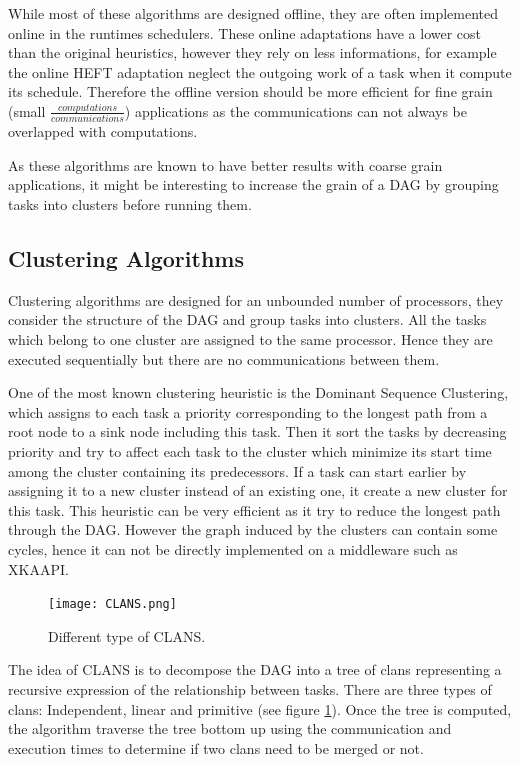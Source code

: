 \documentclass[10pt, conference, compsocconf,pdftex,dvipsnames]{IEEEtran}
\begin{document}
While most of these algorithms are designed offline, they are often
implemented online in the runtimes schedulers. These online adaptations have a
lower cost than the original heuristics, however they rely on less
informations, for example the online HEFT adaptation neglect the outgoing work of
a task when it compute its schedule. Therefore the offline version should be
more efficient for fine grain (small $\frac{computations}{communications}$)
applications as the communications can not always be overlapped with
computations.

As these algorithms are known to have better results with coarse grain
applications, it might be interesting to increase the grain of a DAG by
grouping tasks into clusters before running them.

\subsection{Clustering Algorithms}

Clustering algorithms are designed for an unbounded number of processors, they
consider the structure of the DAG and group tasks into clusters. All the tasks
which belong to one cluster are assigned to the same processor. Hence they are
executed sequentially but there are no communications between them.  

One of the most known clustering heuristic is the Dominant Sequence
Clustering\cite{yang1994dsc}, which assigns to each task a priority
corresponding to the longest path from a root node to a sink node including
this task. Then it sort the tasks by decreasing priority and try to affect
each task to the cluster which minimize its start time among the cluster
containing its predecessors. If a task can start earlier by assigning it to a
new cluster instead of an existing one, it create a new cluster for this task.
This heuristic can be very efficient as it try to reduce the longest path
through the DAG. However the graph induced by the clusters can contain some
cycles, hence it can not be directly implemented on a middleware such as
XKAAPI.

\begin{figure}[htb]
    \centering
    \texttt{[image: CLANS.png]}
    \caption{Different type of CLANS.}
    \label{fig:clans}
\end{figure}

The idea of CLANS
\cite{aubum1990efficient,mccreary1993partitioning,mccreary1993graph} is to
decompose the DAG into a tree of clans representing a recursive expression of
the relationship between tasks. 
There are three types of clans:
Independent, linear and primitive (see figure \ref{fig:clans}). Once the tree
is computed, the algorithm traverse the tree bottom up using the communication
and execution times to determine if two clans need to be merged or not.
\end{document}
